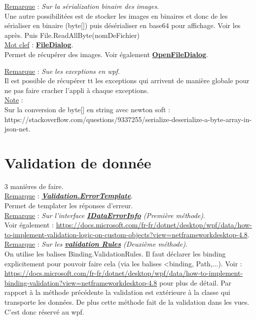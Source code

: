 \documentclass[a4paper,12pt,twoside]{article}
\newcommand{\urlcolor}{magenta}  %
\newcommand{\keycolor}{purple} %
\newcommand{\incode}[1]{{\footnotesize\ttfamily #1}} %
\newcommand{\rem}[2]{\noindent\underline{Remarque} : \textit{#1}.\\ \indent #2}
\newcommand{\note}[1]{\noindent\underline{Note} : \\ \indent #1}
\newcommand{\keyref}[2]{\hypersetup{urlcolor=\keycolor} \href{#1}{\textbf{#2}}\hypersetup{urlcolor=\urlcolor}}
\newcommand{\keyword}[3]{\noindent\underline{Mot clef} : \keyref{#1}{#2}. \\ \indent #3}
\begin{document}
\rem{Sur la sérialization binaire des images}{Une autre possibilitées est de stocker les images en binaires et donc de les sérialiser en binaire (\incode{byte[]}) puis désérialiser en base64 pour affichage. Voir les après. Puis File.ReadAllByte(nomDeFichier)}\\

\keyword{https://docs.microsoft.com/fr-fr/dotnet/api/system.windows.forms.filedialog?view=windowsdesktop-6.0}{FileDialog}{Permet de récupérer des images. Voir également \keyref{https://docs.microsoft.com/en-us/dotnet/api/system.windows.forms.openfiledialog?view=windowsdesktop-6.0}{OpenFileDialog}.}

\rem{Sue les exceptions en wpf}{Il est possible de récupérer tt les exceptions qui arrivent de manière globale pour ne pas faire cracher l'appli à chaque exceptions.}\\

\note{Sur la conversion de byte[] en string avec newton soft : https://stackoverflow.com/questions/9337255/serialize-deserialize-a-byte-array-in-json-net.}\\

\section{Validation de donnée}

3 manières de faire.\\

\rem{\keyref{https://docs.microsoft.com/fr-fr/dotnet/api/system.windows.controls.validation.errortemplate?view=windowsdesktop-6.0}{Validation.ErrorTemplate}}{Permet de templater les réponses d'erreur.}\\

\rem{Sur l'interface \keyref{https://docs.microsoft.com/fr-fr/aspnet/mvc/overview/older-versions-1/models-data/validating-with-the-idataerrorinfo-interface-cs}{IDataErrorInfo} (Première méthode)}{Voir également : \url{https://docs.microsoft.com/fr-fr/dotnet/desktop/wpf/data/how-to-implement-validation-logic-on-custom-objects?view=netframeworkdesktop-4.8}.}\\

\rem{Sur les \keyref{https://docs.microsoft.com/fr-fr/dotnet/api/system.windows.controls.validationrule?view=windowsdesktop-6.0}{validation Rules} (Deuxième méthode)}{On utilise les balises Binding.ValidationRules. Il faut déclarer les binding explicitement pour pouvoir faire cela (via les balises <binding, Path,...). Voir : \url{https://docs.microsoft.com/fr-fr/dotnet/desktop/wpf/data/how-to-implement-binding-validation?view=netframeworkdesktop-4.8} pour plus de détail. Par rapport à la méthode précédente la validation est extérieure à la classe qui transporte les données. De plus cette méthode fait de la validation dans les vues. C'est donc réservé au wpf.}\\
\end{document}
